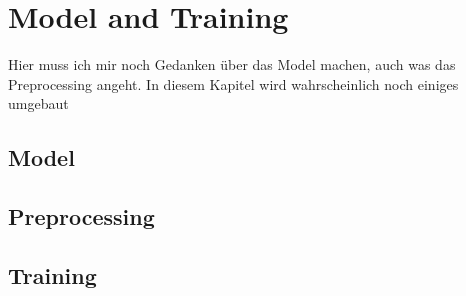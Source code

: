 
\chapter{Model and Training} %

\label{Training} %
\begin{text}
Hier muss ich mir noch Gedanken über das Model machen, auch was das Preprocessing angeht. In diesem Kapitel wird wahrscheinlich noch einiges umgebaut
\end{text}
\section{Model}

\section{Preprocessing}

\section{Training}